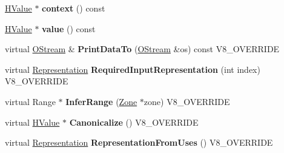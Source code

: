 \begin{DoxyCompactItemize}
\item 
\hypertarget{classv8_1_1internal_1_1_v8___f_i_n_a_l_a8294bece2df148267ec52228e2139030}{}\hyperlink{classv8_1_1internal_1_1_h_value}{H\+Value} $\ast$ {\bfseries context} () const \label{classv8_1_1internal_1_1_v8___f_i_n_a_l_a8294bece2df148267ec52228e2139030}

\item 
\hypertarget{classv8_1_1internal_1_1_v8___f_i_n_a_l_a998b3feae0e84bbe080297551603911f}{}\hyperlink{classv8_1_1internal_1_1_h_value}{H\+Value} $\ast$ {\bfseries value} () const \label{classv8_1_1internal_1_1_v8___f_i_n_a_l_a998b3feae0e84bbe080297551603911f}

\item 
\hypertarget{classv8_1_1internal_1_1_v8___f_i_n_a_l_ac450dad970b14246be761ccf5004924b}{}virtual \hyperlink{classv8_1_1internal_1_1_o_stream}{O\+Stream} \& {\bfseries Print\+Data\+To} (\hyperlink{classv8_1_1internal_1_1_o_stream}{O\+Stream} \&os) const V8\+\_\+\+O\+V\+E\+R\+R\+I\+D\+E\label{classv8_1_1internal_1_1_v8___f_i_n_a_l_ac450dad970b14246be761ccf5004924b}

\item 
\hypertarget{classv8_1_1internal_1_1_v8___f_i_n_a_l_a6c6d1f37f40b113d8f4062f1ffff7215}{}virtual \hyperlink{classv8_1_1internal_1_1_representation}{Representation} {\bfseries Required\+Input\+Representation} (int index) V8\+\_\+\+O\+V\+E\+R\+R\+I\+D\+E\label{classv8_1_1internal_1_1_v8___f_i_n_a_l_a6c6d1f37f40b113d8f4062f1ffff7215}

\item 
\hypertarget{classv8_1_1internal_1_1_v8___f_i_n_a_l_a7d7c752019e44fc1ba3895619da6a7f5}{}virtual Range $\ast$ {\bfseries Infer\+Range} (\hyperlink{classv8_1_1internal_1_1_zone}{Zone} $\ast$zone) V8\+\_\+\+O\+V\+E\+R\+R\+I\+D\+E\label{classv8_1_1internal_1_1_v8___f_i_n_a_l_a7d7c752019e44fc1ba3895619da6a7f5}

\item 
\hypertarget{classv8_1_1internal_1_1_v8___f_i_n_a_l_aad5f871e0a6782c02e742ec017eca3cd}{}virtual \hyperlink{classv8_1_1internal_1_1_h_value}{H\+Value} $\ast$ {\bfseries Canonicalize} () V8\+\_\+\+O\+V\+E\+R\+R\+I\+D\+E\label{classv8_1_1internal_1_1_v8___f_i_n_a_l_aad5f871e0a6782c02e742ec017eca3cd}

\item 
\hypertarget{classv8_1_1internal_1_1_v8___f_i_n_a_l_aeea12f65b170a6d57f5c845443de42cf}{}virtual \hyperlink{classv8_1_1internal_1_1_representation}{Representation} {\bfseries Representation\+From\+Uses} () V8\+\_\+\+O\+V\+E\+R\+R\+I\+D\+E\label{classv8_1_1internal_1_1_v8___f_i_n_a_l_aeea12f65b170a6d57f5c845443de42cf}


\end{DoxyCompactItemize}
